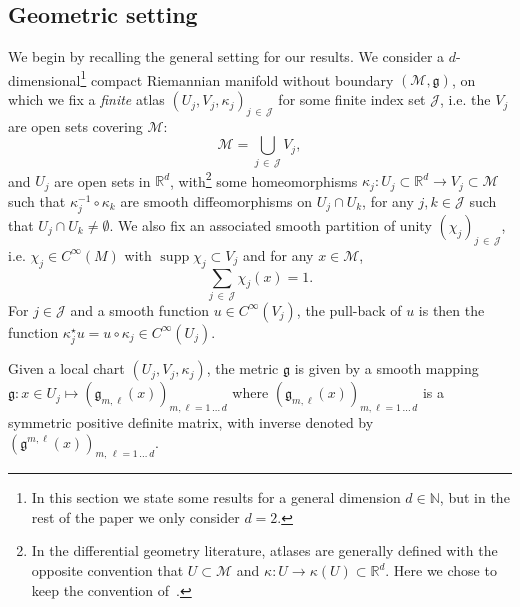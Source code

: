 \documentclass[10pt]{amsart}
\theoremstyle{definition}\newtheorem{defi}[theo]{Definition}\newtheorem{rema}[theo]{Remark}\newtheorem{exam}[theo]{Example}\newtheorem{exem}[theo]{Example}\newtheorem{nota}[theo]{Notation}
\newcommand{\R}{\mathbb{R}}
\newcommand{\N}{\mathbb{N}}
\DeclareMathOperator*{\supp}{supp}
\newcommand{\J}{\mathcal{J}}
\newcommand{\M}{\mathcal{M}}
\newcommand{\g}{\mathfrak{g}}
\newcommand{\kk}{\kappa}
\begin{document}
\subsection{Geometric setting} 
We begin by recalling the general setting for our results. We consider a $d$-dimensio\-nal\footnote{ In this section we state some results for a general dimension $d\in\N$, but in the rest of the paper we only consider $d=2$.} compact Riemannian manifold without boundary $(\M,\g)$, on which we fix a \emph{finite} atlas $(U_j,V_j,\kk_j)_{j\,\in\,\J}$ for some finite index set $\J$, i.e. the $V_j$ are open sets covering $\M$:
\begin{equation*}
\M=\bigcup_{j\,\in\,\J}V_j,
\end{equation*}
and $U_j$ are open sets in $\R^d$, with\footnote{In the differential geometry literature, atlases are generally defined with the opposite convention that $U\subset \M$ and $\kk: U\rightarrow \kk(U)\subset \R^d$. Here we chose to keep the convention of~\cite{BGT}.} some homeomorphisms $\kk_j: U_j\subset \R^d\rightarrow V_j\subset\M$ such that $\kk_j^{-1}\circ \kk_k$ are smooth diffeomorphisms on $U_j\cap U_k$, for any $j,k\in\J$ such that $U_j\cap U_k\neq\emptyset$. We also fix an associated smooth partition of unity $(\chi_j)_{j\,\in\,\J}$, i.e. $\chi_j\in C^{\infty}(M)$ with $\supp\chi_j\subset V_j$ and for any $x\in\M$,
\begin{equation*}
\sum_{j\,\in\,\J}\chi_j(x) = 1.
\end{equation*}
For $j\in \J$ and a smooth function $u\in C^{\infty}(V_j)$, the pull-back of $u$ is then the function $\kk_j^{\star}u = u\circ \kk_j \in C^{\infty}(U_j)$.

Given a local chart $(U_j,V_j,\kk_j)$, the metric $\g$ is given by a smooth mapping $\g: x\in U_j\mapsto (\g_{m,\ell}(x))_{m,\ell=1\,\dots\,d}$ where $(\g_{m,\ell}(x))_{m,\ell=1\,\dots\, d}$ is a symmetric positive definite matrix, with inverse denoted by $(\g^{m,\ell}(x))_{m,\,\ell=1\,\dots\,d}$.
\end{document}
